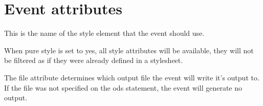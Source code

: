 \section{Event attributes}

\begin{description}

This is the name of the style element that the event should use.


When pure style is set to yes, all style attributes will be available, they will not
be filtered as if they were already defined in a stylesheet.


The file attribute determines which output file the event will write it's output to.
If the file was not specified on the ods statement, the event will generate no output.

\end{description}

